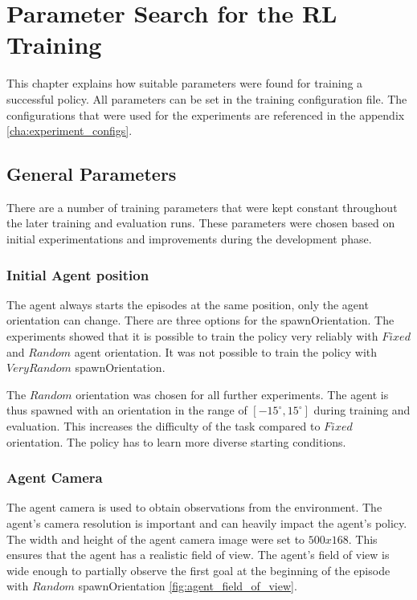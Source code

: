 \chapter{Parameter Search for the \ac{RL} Training}
\label{cha:experiments_training_parameters}

This chapter explains how suitable parameters were found for training a successful policy. All parameters can be set in the training configuration file. The configurations that were used for the experiments are referenced in the appendix \ref{cha:experiment_configs}.


\section{General Parameters}

There are a number of training parameters that were kept constant throughout the later training and evaluation runs. These parameters were chosen based on initial experimentations and improvements during the development phase.

\subsection{Initial Agent position}

The agent always starts the episodes at the same position, only the agent orientation can change. There are three options for the spawnOrientation. The experiments showed that it is possible to train the policy very reliably with $Fixed$ and $Random$ agent orientation. It was not possible to train the policy with $VeryRandom$ spawnOrientation.

The $Random$ orientation was chosen for all further experiments. The agent is thus spawned with an orientation in the range of $[-15^{\circ}, 15^{\circ}]$ during training and evaluation.
This increases the difficulty of the task compared to $Fixed$ orientation. The policy has to learn more diverse starting conditions.

\subsection{Agent Camera}

The agent camera is used to obtain observations from the environment. The agent's camera resolution is important and can heavily impact the agent's policy. The width and height of the agent camera image were set to $500x168$. This ensures that the agent has a realistic field of view. The agent's field of view is wide enough to partially observe the first goal at the beginning of the episode with $Random$ spawnOrientation \ref{fig:agent_field_of_view}.


